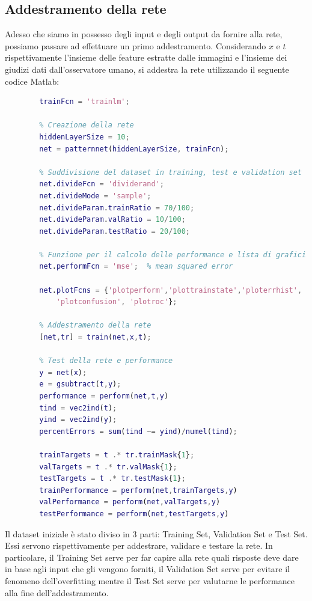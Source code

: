\documentclass[a4paper,11pt]{article}
\begin{document}
    \subsection{Addestramento della rete}
    Adesso che siamo in possesso degli input e degli output da fornire alla rete, possiamo passare ad effettuare un primo addestramento.
    Considerando $x$ e $t$ rispettivamente l'insieme delle feature estratte dalle immagini e l'insieme dei giudizi dati dall'osservatore umano, si addestra la rete
    utilizzando il seguente codice Matlab:
    \begin{lstlisting}[language=Matlab]        
        % Funzione di training
        trainFcn = 'trainlm';  
        
        % Creazione della rete
        hiddenLayerSize = 10;
        net = patternnet(hiddenLayerSize, trainFcn);
        
        % Suddivisione del dataset in training, test e validation set
        net.divideFcn = 'dividerand'; 
        net.divideMode = 'sample'; 
        net.divideParam.trainRatio = 70/100;
        net.divideParam.valRatio = 10/100;
        net.divideParam.testRatio = 20/100;
        
        % Funzione per il calcolo delle performance e lista di grafici da generare
        net.performFcn = 'mse';  % mean squared error
        
        net.plotFcns = {'plotperform','plottrainstate','ploterrhist', ...
            'plotconfusion', 'plotroc'};
        
        % Addestramento della rete
        [net,tr] = train(net,x,t);
        
        % Test della rete e performance
        y = net(x);
        e = gsubtract(t,y);
        performance = perform(net,t,y)
        tind = vec2ind(t);
        yind = vec2ind(y);
        percentErrors = sum(tind ~= yind)/numel(tind);

        trainTargets = t .* tr.trainMask{1};
        valTargets = t .* tr.valMask{1};
        testTargets = t .* tr.testMask{1};
        trainPerformance = perform(net,trainTargets,y)
        valPerformance = perform(net,valTargets,y)
        testPerformance = perform(net,testTargets,y)
    \end{lstlisting}
    Il dataset iniziale è stato diviso in 3 parti: Training Set, Validation Set e Test Set. Essi servono rispettivamente per addestrare, validare e testare la rete.
    In particolare, il Training Set serve per far capire alla rete quali risposte deve dare in base agli input che gli vengono forniti, il Validation Set serve per evitare il fenomeno dell'overfitting mentre il Test Set serve per valutarne le performance alla fine dell'addestramento.
    \newpage
\end{document}
